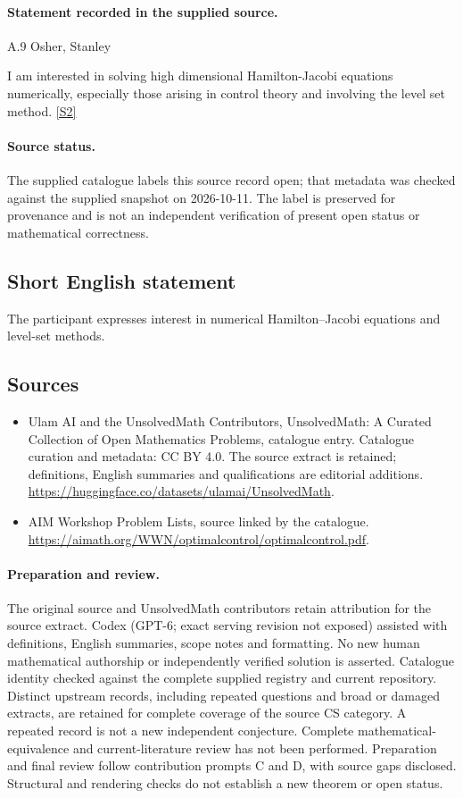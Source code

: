 \documentclass[11pt]{article}
\begin{document}
\paragraph{Statement recorded in the supplied source.}
A.9 Osher, Stanley

I am interested in solving high dimensional Hamilton-Jacobi equations numerically, especially those arising in control theory and involving the level set method. \href{https://aimath.org/WWN/optimalcontrol/optimalcontrol.pdf}{[S2]}
\paragraph{Source status.}
The supplied catalogue labels this source record open; that metadata was checked against the supplied snapshot on 2026-10-11. The label is preserved for provenance and is not an independent verification of present open status or mathematical correctness.
\subsection{Short English statement}
The participant expresses interest in numerical Hamilton--Jacobi equations and level-set methods.
\subsection{Sources}
\begin{itemize}
\item[S1] Ulam AI and the UnsolvedMath Contributors, UnsolvedMath: A Curated Collection of Open Mathematics Problems, catalogue entry. Catalogue curation and metadata: CC BY 4.0. The source extract is retained; definitions, English summaries and qualifications are editorial additions.
\url{https://huggingface.co/datasets/ulamai/UnsolvedMath}.
\item[S2] AIM Workshop Problem Lists, source linked by the catalogue.
\url{https://aimath.org/WWN/optimalcontrol/optimalcontrol.pdf}.
\end{itemize}
\paragraph{Preparation and review.}
The original source and UnsolvedMath contributors retain attribution for the source extract. Codex (GPT-6; exact serving revision not exposed) assisted with definitions, English summaries, scope notes and formatting. No new human mathematical authorship or independently verified solution is asserted. Catalogue identity checked against the complete supplied registry and current repository. Distinct upstream records, including repeated questions and broad or damaged extracts, are retained for complete coverage of the source CS category. A repeated record is not a new independent conjecture. Complete mathematical-equivalence and current-literature review has not been performed. Preparation and final review follow contribution prompts C and D, with source gaps disclosed. Structural and rendering checks do not establish a new theorem or open status.
\label{end:statement}
\end{document}
